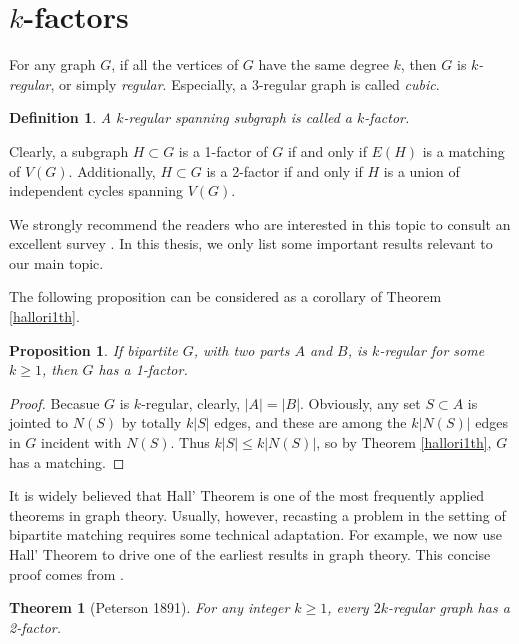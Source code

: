 \documentclass[12pt]{report}
\newtheorem{theorem}{Theorem}
\newtheorem{definition}{Definition}
\newtheorem{proposition}{Proposition}
\begin{document}
\section{$k$-factors}


For any graph $G$, if all the vertices of $G$ have the same degree $k$, then $G$ is {\em $k$-regular}, or simply {\em regular}. Especially, a 3-regular graph is called {\em cubic}.
\begin{definition}
A $k$-regular spanning subgraph is called a $k$-factor.
\end{definition}
Clearly, a subgraph $H\subset G$ is a 1-factor of $G$ if and only if $E(H)$ is a matching of $V(G)$. Additionally, $H\subset G$ is a 2-factor if and only if $H$ is a union of independent cycles spanning $V(G)$.

We strongly recommend the readers who are interested in this topic to consult an excellent survey \cite{plummer2007graph}. In this thesis, we only list some important results relevant to our main topic.


The following proposition can be considered as a corollary of Theorem \ref{hallori1th}.

\begin{proposition}\label{propkrto1f}
If bipartite $G$, with two parts $A$ and $B$, is $k$-regular for some $k\ge1$, then $G$ has a 1-factor.
\end{proposition}
\begin{proof}
Becasue $G$ is $k$-regular, clearly, $|A|=|B|$. Obviously, any set $S\subset A$ is jointed to $N(S)$ by totally $k|S|$ edges, and these are among the $k|N(S)|$ edges in $G$ incident with $N(S)$. Thus $k|S|\le k|N(S)|$, so by Theorem \ref{hallori1th}, $G$ has a matching.




\end{proof}


It is widely believed that Hall' Theorem is one of the most frequently applied theorems in graph theory. Usually, however, recasting a problem in the setting of bipartite matching requires some technical adaptation. For example, we now use Hall' Theorem to drive one of the earliest results in graph theory. This concise proof comes from \cite{diestel2000graph}.

\begin{theorem}[Peterson 1891]\label{petkre2fac}
For any integer $k\ge1$, every $2k$-regular graph has a 2-factor.
\end{theorem}
\end{document}
